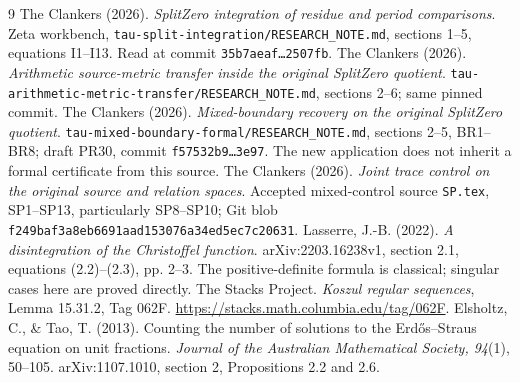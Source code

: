 \begin{thebibliography}{9}
 The Clankers (2026). \emph{SplitZero integration of residue and period comparisons}. Zeta workbench, \texttt{tau-split-integration/RESEARCH\_NOTE.md}, sections 1--5, equations I1--I13. Read at commit \texttt{35b7aeaf\ldots2507fb}.
 The Clankers (2026). \emph{Arithmetic source-metric transfer inside the original SplitZero quotient}. \texttt{tau-arithmetic-metric-transfer/RESEARCH\_NOTE.md}, sections 2--6; same pinned commit.
 The Clankers (2026). \emph{Mixed-boundary recovery on the original SplitZero quotient}. \texttt{tau-mixed-boundary-formal/RESEARCH\_NOTE.md}, sections 2--5, BR1--BR8; draft PR30, commit \texttt{f57532b9\ldots3e97}. The new application does not inherit a formal certificate from this source.
 The Clankers (2026). \emph{Joint trace control on the original source and relation spaces}. Accepted mixed-control source \texttt{SP.tex}, SP1--SP13, particularly SP8--SP10; Git blob \texttt{f249baf3a8eb6691aad153076a34ed5ec7c20631}.
 Lasserre, J.-B. (2022). \emph{A disintegration of the Christoffel function}. arXiv:2203.16238v1, section 2.1, equations (2.2)--(2.3), pp. 2--3. The positive-definite formula is classical; singular cases here are proved directly.
 The Stacks Project. \emph{Koszul regular sequences}, Lemma 15.31.2, Tag 062F. \url{https://stacks.math.columbia.edu/tag/062F}.
 Elsholtz, C., \& Tao, T. (2013). Counting the number of solutions to the Erd\H{o}s--Straus equation on unit fractions. \emph{Journal of the Australian Mathematical Society, 94}(1), 50--105. arXiv:1107.1010, section 2, Propositions 2.2 and 2.6.
\end{thebibliography}
